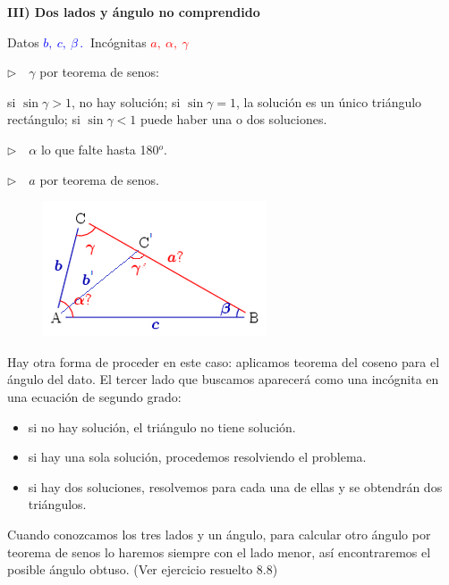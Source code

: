 \vspace{0.4cm}
\textbf{III) Dos lados y ángulo no comprendido}
\begin{multicols}{2}

Datos \textcolor{blue}{$b,\ c, \ \beta \, . \ $} Incógnitas \textcolor{red}{$a,\ \alpha, \ \gamma$}

$\triangleright \quad \gamma$ por teorema de senos:

si $\sin \gamma>1$, no hay solución; si $\sin \gamma=1$, la solución es un único triángulo rectángulo; si $\sin \gamma<1$ puede haber una o dos soluciones.

$\triangleright \quad \alpha$ lo que falte hasta 180$^o$. 

$\triangleright \quad a$ por teorema de senos. 

\begin{figure}[H]
	\centering
	\includegraphics[width=.45\textwidth]{img-triang/RTC3.png}
\end{figure}	
\end{multicols}

\begin{small}
\textsf{Hay otra forma de proceder en este caso: aplicamos teorema del coseno para el ángulo del dato. El tercer lado que buscamos aparecerá como una incógnita en una ecuación de segundo grado:}

\vspace{-2mm} \begin{itemize}
\vspace{-2mm} \item \textsf{si no hay solución, el triángulo no tiene solución.}	
\vspace{-2mm} \item \textsf{si hay una sola solución, procedemos resolviendo el problema.}
\vspace{-2mm} \item \textsf{si hay dos soluciones, resolvemos para cada una de ellas y se obtendrán dos triángulos.}
\end{itemize}
\vspace{-2mm} \textsf{Cuando conozcamos los tres lados y un ángulo, para calcular otro ángulo por teorema de senos lo haremos siempre con el lado menor, así encontraremos el posible ángulo obtuso. (Ver ejercicio resuelto 8.8)} \end{small}


